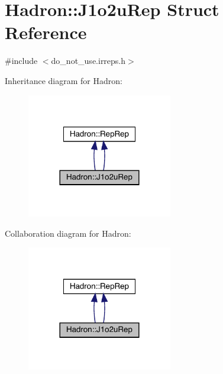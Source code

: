 \hypertarget{structHadron_1_1J1o2uRep}{}\section{Hadron\+:\+:J1o2u\+Rep Struct Reference}
\label{structHadron_1_1J1o2uRep}


{\ttfamily \#include $<$do\+\_\+not\+\_\+use.\+irreps.\+h$>$}



Inheritance diagram for Hadron\+:
\nopagebreak
\begin{figure}[H]
\begin{center}
\leavevmode
\includegraphics[width=180pt]{de/d1a/structHadron_1_1J1o2uRep__inherit__graph}
\end{center}
\end{figure}


Collaboration diagram for Hadron\+:
\nopagebreak
\begin{figure}[H]
\begin{center}
\leavevmode
\includegraphics[width=180pt]{de/d90/structHadron_1_1J1o2uRep__coll__graph}
\end{center}
\end{figure}
